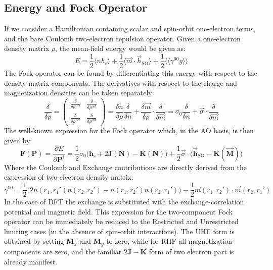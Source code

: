 \documentclass[12pt]{article}
\newcommand{\pfrac}[2]{\frac{\partial #1}{\partial #2}} 				%
\newcommand{\ev}[1]{\langle #1 \rangle}
\newcommand{\evv}[1]{\langle\langle #1 \rangle\rangle}
\begin{document}
\subsection{Energy and Fock Operator}
If we consider a Hamiltonian containing scalar and spin-orbit one-electron terms, and the bare Coulomb two-electron repulsion operator.
Given a one-electron density matrix $\rho$, the mean-field energy would be given as:
\begin{equation}
 E = \frac{1}{2}\ev{nh_\mathrm{s}} + \frac{1}{2}\ev{\vec{m}\cdot\vec{h}_\mathrm{SO}} + \frac{1}{2}\evv{\gamma^{00}g}
\end{equation}
The Fock operator can be found by differentiating this energy with respect to the density matrix components.
The derivatives with respect to the charge and magnetization densities can be taken separately:
\begin{equation}
 \frac{\delta}{\delta\rho} = 
  \begin{pmatrix} \frac{\delta}{\delta\rho^{\alpha\alpha}} & \frac{\delta}{\delta\rho^{\alpha\beta}} \\
                  \frac{\delta}{\delta\rho^{\beta\alpha}}  & \frac{\delta}{\delta\rho^{\beta\beta}} \end{pmatrix} =
  \frac{\delta n}{\delta\rho}\frac{\delta}{\delta n} + \frac{\delta \vec{m}}{\delta\rho}\cdot\frac{\delta}{\delta \vec{m}} = 
    \sigma_0\frac{\delta}{\delta n} + \vec{\sigma}\cdot\frac{\delta}{\delta\vec{m}}
\end{equation}
The well-known expression for the Fock operator which, in the AO basis, is then given by:
\begin{equation}
 \mathbf{F}(\mathbf{P}) = \pfrac{E}{\mathbf{P}^\mathrm{t}} = \frac{1}{2}\sigma_0\big(\mathbf{h}_\mathrm{s} + 2\mathbf{J}(\mathbf{N}) - \mathbf{K}(\mathbf{N})\big) +
  \frac{1}{2}\vec{\sigma}\cdot\big(\vec{\mathbf{h}}_\mathrm{SO} - \mathbf{K}(\vec{\mathbf{M}})\big)
\end{equation}
Where the Coulomb and Exchange contributions are directly derived from the expression of two-electron density matrix:
\begin{equation}
 \gamma^{00} = \frac{1}{2}\big(2n(r_1,r_1')n(r_2,r_2')-n(r_1,r_2')n(r_2,r_1')\big) - \frac{1}{2}\vec{m}(r_1,r_2')\cdot\vec{m}(r_2,r_1') 
\end{equation}
In the case of DFT the exchange is substituted with the exchange-correlation potential and magnetic field.
This expression for the two-component Fock operator can be immediately be reduced to the Restricted and Unrestricted limiting cases (in the absence of spin-orbit interactions).
The UHF form is obtained by setting $\mathbf{M}_x$ and $\mathbf{M}_y$ to zero, while for RHF all magnetization components are zero, and the familiar $2\mathbf{J} - \mathbf{K}$ form of two electron part is already manifest.
\end{document}
